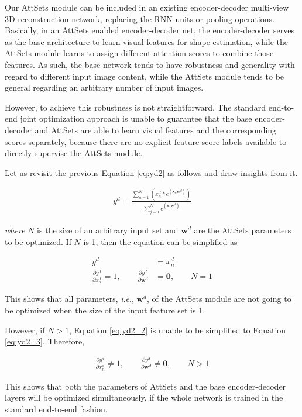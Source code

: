 \documentclass[twocolumn]{svjour3}    \pdfoutput=1
\newcommand{\nickname}{AttSets}
\newcommand{\ie}{\textit{i}.\textit{e}., }
\begin{document}
Our \nickname{} module can be included in an existing encoder-decoder multi-view 3D reconstruction network, replacing the RNN units or pooling operations. Basically, in an \nickname{} enabled encoder-decoder net, the encoder-decoder serves as the base architecture to learn visual features for shape estimation, while the \nickname{} module learns to assign different attention scores to combine those features. As such, the base network tends to have robustness and generality with regard to different input image content, while the \nickname{} module tends to be general regarding an arbitrary number of input images. 

However, to achieve this robustness is not straightforward. The standard end-to-end joint optimization approach is unable to guarantee that the base encoder-decoder and \nickname{} are able to learn visual features and the corresponding scores separately, because there are no explicit feature score labels available to directly supervise the \nickname{} module. 

Let us revisit the previous Equation \ref{eq:yd2} as follows and draw insights from it.
\begin{ceqn}
\begin{align}
\label{eq:yd2_2}
y^d =\frac{\sum^N_{n=1} \left( x^d_n * e^ {(\boldsymbol{x}_n\boldsymbol{w}^d)} \right) }
{\sum^N_{j=1}e^{(\boldsymbol{x}_j\boldsymbol{w}^d)}}
\end{align}
\end{ceqn}
\textit{where} $N$ is the size of an arbitrary input set and $\boldsymbol{w}^d$ are the \nickname{} parameters to be optimized. If $N$ is 1, then the equation can be simplified as
\begin{ceqn}
\begin{align}
\label{eq:yd2_3}
y^d &= x^d_n \\
\frac{\partial y^d}{\partial x^d_n} =1, \qquad   \label{eq:yd2_33}
\frac{\partial y^d}{\partial \boldsymbol{w}^d} &=\boldsymbol{0}, \qquad N=1 
\end{align}
\end{ceqn}
This shows that all parameters, \ie $\boldsymbol{w}^d$, of the \nickname{} module are not going to be optimized when the size of the input feature set is 1. 

However, if $N>1$, Equation \ref{eq:yd2_2} is unable to be simplified to Equation \ref{eq:yd2_3}. Therefore, 
\begin{ceqn}
\begin{align}
\label{eq:yd2_44}
\frac{\partial y^d}{\partial x^d_n} \neq 1, \qquad
\frac{\partial y^d}{\partial \boldsymbol{w}^d } \neq \boldsymbol{0}, \qquad N>1
\end{align}
\end{ceqn}
This shows that both the parameters of \nickname{} and the base encoder-decoder layers will be optimized simultaneously, if the whole network is trained in the standard end-to-end fashion.
\end{document}
